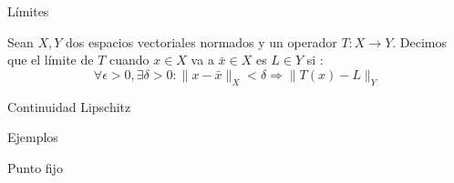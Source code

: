\documentclass[12pt,aspectratio=169,xcolor=dvipsnames]{beamer}
\begin{document}
\begin{frame}{Límites}
    \begin{block}{}
        Sean $X,Y$ dos espacios vectoriales normados y un operador $T:X\to Y$. Decimos que el límite de $T$ cuando $x\in X$ va a $\bar x\in X$ es $L\in Y$ si :
        $$ \forall \epsilon >0, \exists \delta>0: \|x- \bar x\|_X< \delta \Rightarrow \|T(x) - L\|_Y$$
    \end{block}
\end{frame}
\begin{frame}{Continuidad Lipschitz}
\end{frame}
\begin{frame}
    Ejemplos
\end{frame}
\begin{frame}{Punto fijo}
\end{frame}
\begin{frame}
    \maketitle
\end{frame}
\end{document}
